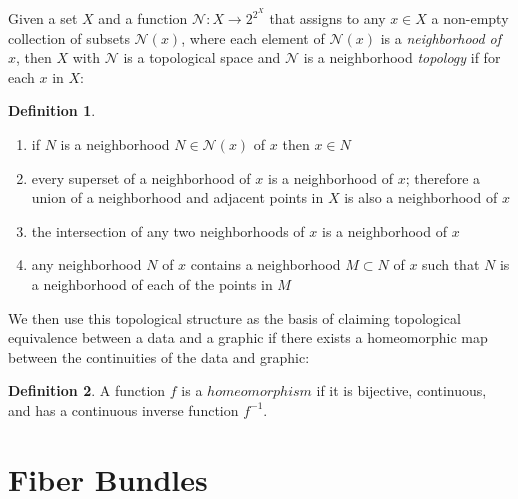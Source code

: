 \documentclass[review]{vgtc}
\theoremstyle{definition}
\newtheorem{definition}{Definition}[section]
\theoremstyle{remark}
\begin{document}
 Given a set $X$ and a function $\mathcal{N}:X\to 2^{2^X}$ that assigns to any $x\in X$ a non-empty collection of subsets $\mathcal{N}(x)$, where each element of $\mathcal{N}(x)$ is a \emph{neighborhood of $x$}, then $X$ with  $\mathcal{N}$ is a \textcolor{base}{topological space} and $\mathcal{N}$ is a neighborhood \emph{topology} if for each $x$ in $X$: \cite{brownronaldTopologyGroupoids2006}

\begin{definition}\label{def:topology}
\begin{enumerate}
  \item if $N$ is a neighborhood $N \in \mathcal{N}(x)$ of $x$ then $x \in N$
  \item every superset of a neighborhood of $x$ is a neighborhood of $x$; therefore a union of a neighborhood and adjacent points in $X$ is also a neighborhood of $x$
  \item the intersection of any two neighborhoods of $x$ is a neighborhood of $x$
  \item any neighborhood $N$ of $x$ contains a neighborhood $M \subset N$ of $x$ such that $N$ is a neighborhood of each of the points in $M$
\end{enumerate}
\end{definition}

We then use this topological structure as the basis of claiming topological equivalence between a data and a graphic if there exists a homeomorphic map between the continuities of the data and graphic:

\begin{definition}
  A function $f$ is a $homeomorphism$ if it is bijective, continuous, and has a continuous inverse function $f^{-1}$.
\end{definition}


\section{Fiber Bundles}
\end{document}
